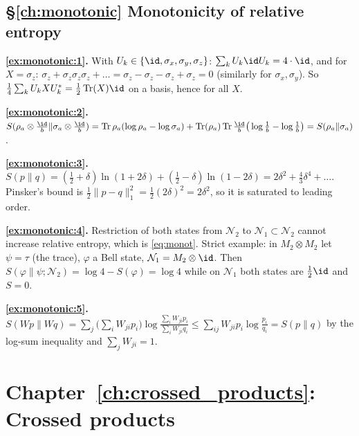 {\subsection*{\S\ref{ch:monotonic} Monotonicity of relative entropy}
\textbf{\ref{ex:monotonic:1}.} With $U_k\in\{\id,\sigma_x,\sigma_y,\sigma_z\}$: $\sum_kU_k\id U_k=4\cdot\id$, and for $X=\sigma_z$: $\sigma_z+\sigma_z\sigma_z\sigma_z+\ldots=\sigma_z-\sigma_z-\sigma_z+\sigma_z=0$ (similarly for $\sigma_x,\sigma_y$). So $\frac14\sum_kU_kXU_k^*=\frac12\Tr(X)\id$ on a basis, hence for all $X$.\par
\textbf{\ref{ex:monotonic:2}.} $S(\rho_a\otimes\frac\id b\|\sigma_a\otimes\frac\id b)=\Tr\rho_a(\log\rho_a-\log\sigma_a)+\Tr(\rho_a)\Tr\frac\id b\big(\log\frac1b-\log\frac1b\big)=S(\rho_a\|\sigma_a)$.\par
\textbf{\ref{ex:monotonic:3}.} $S(p\|q)=(\frac12+\delta)\ln(1+2\delta)+(\frac12-\delta)\ln(1-2\delta)=2\delta^2+\frac43\delta^4+\dots$. Pinsker's bound is $\frac12\|p-q\|_1^2=\frac12(2\delta)^2=2\delta^2$, so it is saturated to leading order.\par
\textbf{\ref{ex:monotonic:4}.} Restriction of both states from $\mathcal N_2$ to $\mathcal N_1\subset\mathcal N_2$ cannot increase relative entropy, which is \eqref{eq:monot}. Strict example: in $M_2\otimes M_2$ let $\psi=\tau$ (the trace), $\varphi$ a Bell state, $\mathcal N_1=M_2\otimes\id$. Then $S(\varphi\|\psi;\mathcal N_2)=\log4-S(\varphi)=\log4$ while on $\mathcal N_1$ both states are $\frac12\id$ and $S=0$.\par
\textbf{\ref{ex:monotonic:5}.} $S(Wp\|Wq)=\sum_j\big(\sum_iW_{ji}p_i\big)\log\frac{\sum_iW_{ji}p_i}{\sum_iW_{ji}q_i}\le\sum_{ij}W_{ji}p_i\log\frac{p_i}{q_i}=S(p\|q)$ by the log-sum inequality and $\sum_jW_{ji}=1$.\par

\section*{Chapter~\ref{ch:crossed_products}: Crossed products}

}

